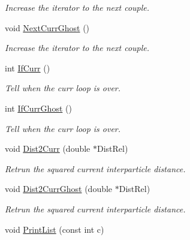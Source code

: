 \begin{DoxyCompactItemize}
\begin{DoxyCompactList}\small\item\em \-Increase the iterator to the next couple. \end{DoxyCompactList}\item 
\hypertarget{classDdLinkedList_a570f38547139c0b1405fde555f276b9c}{void \hyperlink{classDdLinkedList_a570f38547139c0b1405fde555f276b9c}{\-Next\-Curr\-Ghost} ()}\label{classDdLinkedList_a570f38547139c0b1405fde555f276b9c}

\begin{DoxyCompactList}\small\item\em \-Increase the iterator to the next couple. \end{DoxyCompactList}\item 
int \hyperlink{classDdLinkedList_a63c5d18d3a487d1a8ab2a5881c6acb38}{\-If\-Curr} ()
\begin{DoxyCompactList}\small\item\em \-Tell when the curr loop is over. \end{DoxyCompactList}\item 
\hypertarget{classDdLinkedList_a1473510db4cdf7f15b2875ad737e351e}{int \hyperlink{classDdLinkedList_a1473510db4cdf7f15b2875ad737e351e}{\-If\-Curr\-Ghost} ()}\label{classDdLinkedList_a1473510db4cdf7f15b2875ad737e351e}

\begin{DoxyCompactList}\small\item\em \-Tell when the curr loop is over. \end{DoxyCompactList}\item 
void \hyperlink{classDdLinkedList_ad4860e7b4a26d4b424e5c98b7c6bae09}{\-Dist2\-Curr} (double $\ast$\-Dist\-Rel)
\begin{DoxyCompactList}\small\item\em \-Retrun the squared current interparticle distance. \end{DoxyCompactList}\item 
void \hyperlink{classDdLinkedList_a88042fab4b1c26be298e1b40f7409cd3}{\-Dist2\-Curr\-Ghost} (double $\ast$\-Dist\-Rel)
\begin{DoxyCompactList}\small\item\em \-Retrun the squared current interparticle distance. \end{DoxyCompactList}\item 
\hypertarget{classDdLinkedList_abacbda4ce7eed0eee33efe489157ff81}{void \hyperlink{classDdLinkedList_abacbda4ce7eed0eee33efe489157ff81}{\-Print\-List} (const int c)}\label{classDdLinkedList_abacbda4ce7eed0eee33efe489157ff81}


\end{DoxyCompactItemize}
